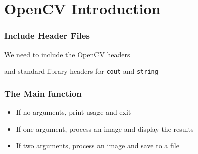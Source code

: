 \section{OpenCV Introduction}






\begin{frame}
\frametitle{Include Header Files}
\begin{center}
We need to include the OpenCV headers

\pause
\vspace{1 em}
and standard library headers for {\tt cout} and {\tt string}

\end{center}

\end{frame}


\begin{frame}
\frametitle{The Main function}
\begin{center}

\begin{itemize}
\item If no arguments, print usage and exit
\item If one argument, process an image and display the results
\item If two arguments, process an image and save to a file
\end{itemize}
\end{center}

\end{frame}


